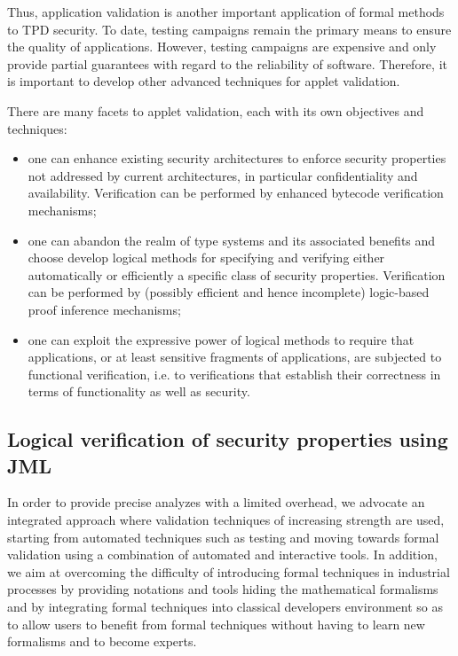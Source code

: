 Thus, application validation is another important application of
formal methods to TPD security. To date, testing campaigns remain the
primary means to ensure the quality of applications. However, testing
campaigns are expensive and only provide partial guarantees with
regard to the reliability of software. Therefore, it is important to
develop other advanced techniques for applet validation.

There are many facets to applet validation, each with its own
objectives and techniques:
\begin{itemize}
\item one can enhance existing security architectures to enforce
security properties not addressed by current architectures, in
particular confidentiality and availability.  Verification can be
performed by enhanced bytecode verification mechanisms;


\item one can abandon the realm of type systems and its associated
benefits and choose develop logical methods for specifying and
verifying either automatically or efficiently a specific class of
security properties. Verification can be performed by (possibly
efficient and hence incomplete) logic-based proof inference
mechanisms;


\item one can exploit the expressive power of logical methods to
require that applications, or at least sensitive fragments of
applications, are subjected to functional verification, i.e. to
verifications that establish their correctness in terms of
functionality as well as security.
\end{itemize}



\subsection{Logical verification of security properties using JML}
In order to provide precise analyzes with a limited overhead, we
advocate an integrated approach where validation techniques of
increasing strength are used, starting from automated techniques such
as testing and moving towards formal validation using a combination of
automated and interactive tools. In addition, we aim at overcoming the
difficulty of introducing formal techniques in industrial processes by
providing notations and tools hiding the mathematical formalisms and
by integrating formal techniques into classical developers environment
so as to allow users to benefit from formal techniques without having
to learn new formalisms and to become experts.

